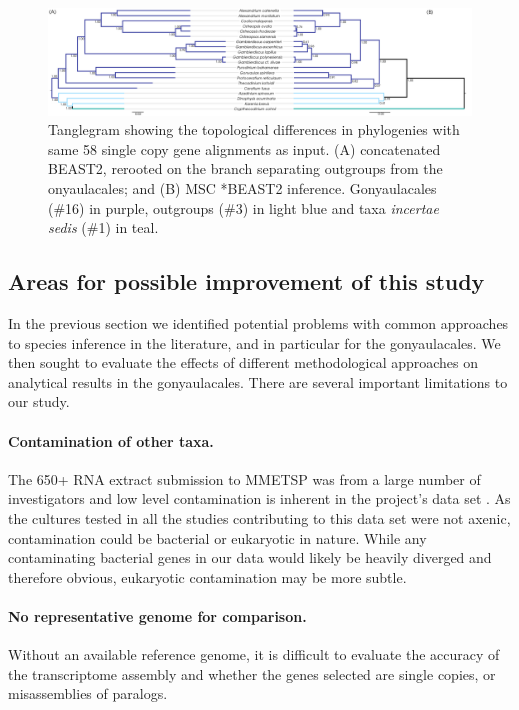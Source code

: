 \documentclass[12pt]{article}
\begin{document}
\begin{figure} 
\includegraphics[scale=.25]{figures/SC-MSC-BI_vs_SC-concat-BI.png} 
\caption{Tanglegram showing the topological differences in phylogenies with same 58 single copy gene alignments as input. (A) concatenated BEAST2, rerooted on the branch separating outgroups from the onyaulacales; and (B) MSC *BEAST2 inference. Gonyaulacales (\#16) in purple, outgroups (\#3) in light blue and taxa \textit{incertae sedis} (\#1) in teal.} 
\label{fig:tangleconcatBI}
\end{figure} 
\FloatBarrier

\subsection*{Areas for possible improvement of this study}
In the previous section we identified potential problems with common approaches to species inference in the literature, and in particular for the gonyaulacales. 
We then sought to evaluate the effects of different methodological approaches on analytical results in the gonyaulacales. 
There are several important limitations to our study. 
\paragraph*{Contamination of other taxa.} 
The 650+ RNA extract submission to MMETSP was from a large number of investigators and low level contamination is inherent in the project's data set \cite{keeling2014marine}. 
As the cultures tested in all the studies contributing to this data set were not axenic, contamination could be bacterial or eukaryotic in nature. 
While any contaminating bacterial genes in our data would likely be heavily diverged and therefore obvious, eukaryotic contamination may be more subtle.
\paragraph*{No representative genome for comparison.} 
Without an available reference genome, it is difficult to evaluate the accuracy of the transcriptome assembly and whether the genes selected are single copies, or misassemblies of paralogs.
\end{document}
